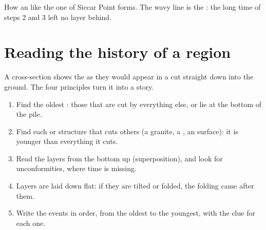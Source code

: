 \begin{omfigure}

{\small How an  like the one of Siccar Point forms. The wavy
line is the : the long time of steps 2 and 3 left no layer
behind.}
\label{fig:g7:geological-time:unconformity}
\end{omfigure}

\section{Reading the history of a region}

A cross-section shows the  as they would appear in a cut straight
down into the ground. The four principles turn it into a story.

\begin{method}\label{met:g7:geological-time:ordering}
\begin{enumerate}
  \item Find the oldest : those that are cut by everything else, or
        lie at the bottom of the pile.
  \item Find each  or structure that cuts others (a granite, a
        , an  surface): it is younger than everything it
        cuts.
  \item Read the layers from the bottom up (superposition), and look for
        unconformities, where time is missing.
  \item Layers are laid down flat: if they are tilted or folded, the
        folding came after them.
  \item Write the events in order, from the oldest to the youngest, with
        the clue for each one.
\end{enumerate}
\end{method}

